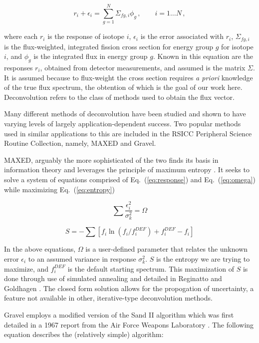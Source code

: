 \documentclass[journal]{IEEEtran}
\newcommand{\EQ}[1]{Eq.~(\ref{#1})}               %
\begin{document}
\begin{equation}
  r_i + \epsilon_i = \sum_{g=1}^{N} \Sigma_{fg,i}  \phi_g\, , 
    \qquad i = 1 \ldots N \, ,
\label{eq:response}
\end{equation}

where each $r_i$ is the response of isotope $i$, $\epsilon_i$ is the error associated with $r_i$, $\Sigma_{fg,i}$ is the flux-weighted, integrated fission cross section for energy group $g$ for isotope $i$, and $\phi_g$ is the integrated flux in energy group $g$.
Known in this equation are the responses $r_i$, obtained from detector measurements, and assumed is the matrix $\Sigma$.
It is assumed because to flux-weight the cross section requires {\it a priori} knowledge of the true flux spectrum, the obtention of which is the goal of our work here.
Deconvolution refers to the class of methods used to obtain the flux vector.

Many different methods of deconvolution have been studied and shown to have varying levels of largely application-dependent success.
Two popular methods used in similar applications to this are included in the RSICC Peripheral Science Routine Collection, namely, MAXED and Gravel.

MAXED, arguably the more sophisticated of the two finds its basis in information theory and leverages the principle of maximum entropy \cite{reginatto1999maxed}.
It seeks to solve a system of equations comprised of \EQ{eq:response} and \EQ{eq:omega} while maximizing \EQ{eq:entropy}

\begin{equation}
  \sum \frac{\epsilon_i^2}{\sigma_k^2} = \Omega
\label{eq:omega}
\end{equation}

\begin{equation}
  S = - \sum [f_i \ln(f_i/f_i^{DEF}) + f_i^{DEF} - f_i]
\label{eq:entropy}
\end{equation}

In the above equations, $\Omega$ is a user-defined parameter that relates the unknown error $\epsilon_i$ to an assumed variance in response $\sigma_k^2$.
$S$ is the entropy we are trying to maximize, and $f_i^{DEF}$ is the default starting spectrum.
This maximization of $S$ is done through use of simulated annealing and detailed in Reginatto and Goldhagen \cite{reginatto1999maxed}.
The closed form solution allows for the propogation of uncertainty, a feature not available in other, iterative-type deconvolution methods.

Gravel employs a modified version of the Sand II algorithm which was first detailed in a 1967 report from the Air Force Weapons Laboratory \cite{mcelroy1967computer}.
The following equation describes the (relatively simple) algorithm:
\end{document}
